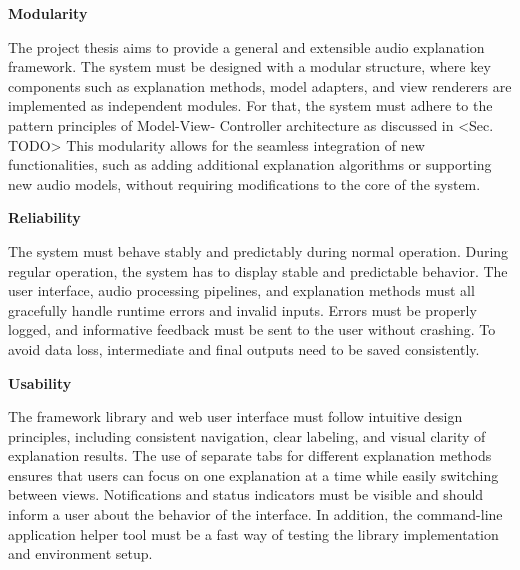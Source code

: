 \documentclass[
    bindingoffset=5mm,  %
    footnoteindent=3mm, %
    hyphenation=true    %
]{src/wut-thesis}
\begin{document}
\begin{description}
    \item \textbf{Modularity}

         The project thesis aims to provide a general and extensible audio explanation framework. The system must be 
    designed with a modular structure, where key components such as explanation methods, model adapters, and view renderers
    are implemented as independent modules. For that, the system must adhere to the pattern principles of Model-View-
    Controller architecture as discussed in <Sec. TODO> This modularity allows for the seamless integration of new 
    functionalities, such as adding additional explanation algorithms or supporting new audio models, without requiring 
    modifications to the core of the system.

    \item \textbf{Reliability}

        The system must behave stably and predictably during normal operation. During regular operation, the system has to
    display stable and predictable behavior. The user interface, audio processing pipelines, and explanation methods must
    all gracefully handle runtime errors and invalid inputs. Errors must be properly logged, and informative feedback must
    be sent to the user without crashing. To avoid data loss, intermediate and final outputs need to be saved consistently.

    \item \textbf{Usability}

        The framework library and web user interface must follow intuitive design principles, including consistent
    navigation, clear labeling, and visual clarity of explanation results. The use of separate tabs for different 
    explanation methods ensures that users can focus on one explanation at a time while easily switching between views. 
    Notifications and status indicators must be visible and should inform a user about the behavior of the interface. In 
    addition, the command-line application helper tool must be a fast way of testing the library implementation and environment setup.

\end{description}
\end{document}
